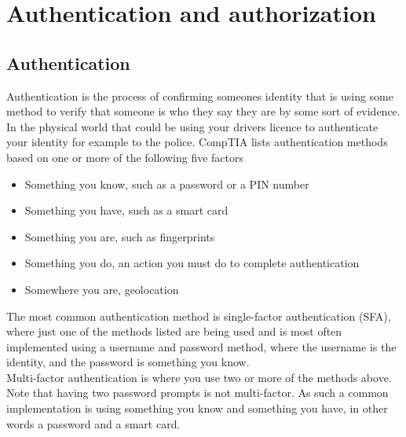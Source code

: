 \documentclass[../main.tex]{subfiles}
\begin{document}


\pagebreak\section{Authentication and authorization}
\subsection*{Authentication}
Authentication is the process of confirming someones identity that is using some method to verify that someone is who they say they are by some sort of evidence. In the physical world that could be using your drivers licence to authenticate your identity for example to the police. CompTIA lists authentication methods based on one or more of the following five factors \cite[p. 131]{comptia_sec}
\begin{itemize}
    \item Something you know, such as a password or a PIN number
    \item Something you have, such as a smart card
    \item Something you are, such as fingerprints
    \item Something you do, an action you must do to complete authentication
    \item Somewhere you are, geolocation
\end{itemize}
The most common authentication method is single-factor authentication (SFA), where just one of the methods listed are being used and is most often implemented using a username and password method, where the username is the identity, and the password is something you know.\\
Multi-factor authentication is where you use two or more of the methods above. Note that having two password prompts is not multi-factor. As such a common implementation is using something you know and something you have, in other words a password and a smart card.
\end{document}

